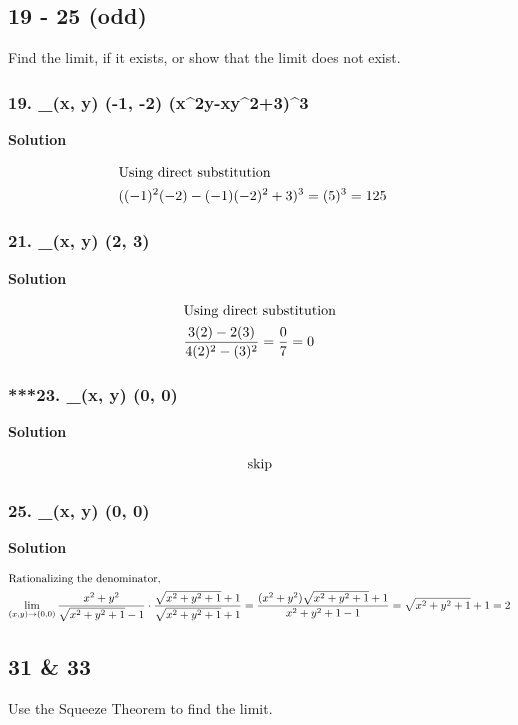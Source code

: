 \documentclass{article}
\newcommand{\limit}[4]{\lim_{(#1, #2) \to (#3, #4)}}
\begin{document}
\subsection*{19 - 25 (odd)}
Find the limit, if it exists, or show that the limit does not exist.
\subsubsection*{19. \limit x y {-1} {-2} (x^2y-xy^2+3)^3}
\centerline{\textbf{Solution}}
\begin{align*}
    \intertext{Using direct substitution}
    ((-1)^2(-2) - (-1)(-2)^2 + 3)^3 &= (5)^3 = 125
\end{align*}
\subsubsection*{21. \limit x y 2 3 \displaystyle{}}
\centerline{\textbf{Solution}}
\begin{align*}
    \intertext{Using direct substitution}
    \displaystyle\frac{3(2) - 2(3)}{4(2)^2 - (3)^2} &= \displaystyle\frac{0}{7} = 0
\end{align*}
\subsubsection*{***23. \limit x y 0 0 \displaystyle{}}
\centerline{\textbf{Solution}}
\begin{align*}
    \intertext{skip} 
\end{align*}
\subsubsection*{25. \limit x y 0 0 \displaystyle{}}
\centerline{\textbf{Solution}}
\begin{align*}
    \intertext{Rationalizing the denominator,}
    \limit x y 0 0 \displaystyle\frac{x^2+y^2}{\sqrt{x^2+y^2+1} - 1} \cdot \frac{\sqrt{x^2+y^2 + 1}+1}{\sqrt{x^2+y^2+1}+1} = \frac{(x^2+y^2)\sqrt{x^2+y^2+1}+1}{x^2+y^2+1-1} = \sqrt{x^2+y^2+1}+1 = 2
\end{align*}
\subsection*{31 \& 33}
Use the Squeeze Theorem to find the limit.
\end{document}
